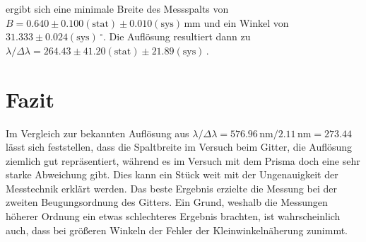 \documentclass[a4paper, 12pt]{scrartcl}
\begin{document}
ergibt sich eine minimale Breite des Messspalts von $B=0.640\pm0.100(\text{stat})\pm0.010(\text{sys})\,\text{mm}$ und ein Winkel von $31.333\pm0.024(\text{sys})\,^\circ$. Die Auflösung resultiert dann zu $\lambda/\Delta\lambda=264.43\pm41.20(\text{stat})\pm21.89(\text{sys})\,$.

\section{Fazit}
Im Vergleich zur bekannten Auflösung aus $\lambda/\Delta\lambda=576.96\,\text{nm}/2.11\,\text{nm}=273.44$ lässt sich feststellen, dass die Spaltbreite im Versuch beim Gitter, die Auflösung ziemlich gut repräsentiert, während es im Versuch mit dem Prisma doch eine sehr starke Abweichung gibt. Dies kann ein Stück weit mit der Ungenauigkeit der Messtechnik erklärt werden. Das beste Ergebnis erzielte die Messung bei der zweiten Beugungsordnung des Gitters. Ein Grund, weshalb die Messungen höherer Ordnung ein etwas schlechteres Ergebnis brachten, ist wahrscheinlich auch, dass bei größeren Winkeln der Fehler der Kleinwinkelnäherung zunimmt.
\end{document}
